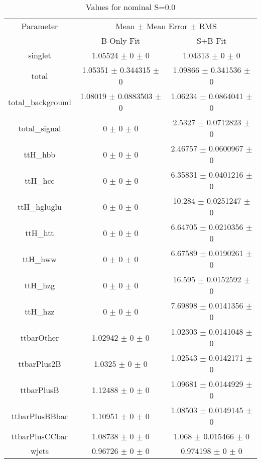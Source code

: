 \begin{table}
\centering
\caption{Values for nominal S=0.0}
\begin{tabular}{ccc}
\toprule
Parameter & \multicolumn{2}{c}{Mean $\pm$ Mean Error $\pm$ RMS}\\
 & B-Only Fit & S+B Fit\\
\midrule
singlet & \num{1.05524} $\pm$ \num{0} $\pm$ \num{0} & \num{1.04313} $\pm$ \num{0} $\pm$ \num{0}\\
total & \num{1.05351} $\pm$ \num{0.344315} $\pm$ \num{0} & \num{1.09866} $\pm$ \num{0.341536} $\pm$ \num{0}\\
total\_background & \num{1.08019} $\pm$ \num{0.0883503} $\pm$ \num{0} & \num{1.06234} $\pm$ \num{0.0864041} $\pm$ \num{0}\\
total\_signal & \num{0} $\pm$ \num{0} $\pm$ \num{0} & \num{2.5327} $\pm$ \num{0.0712823} $\pm$ \num{0}\\
ttH\_hbb & \num{0} $\pm$ \num{0} $\pm$ \num{0} & \num{2.46757} $\pm$ \num{0.0600967} $\pm$ \num{0}\\
ttH\_hcc & \num{0} $\pm$ \num{0} $\pm$ \num{0} & \num{6.35831} $\pm$ \num{0.0401216} $\pm$ \num{0}\\
ttH\_hgluglu & \num{0} $\pm$ \num{0} $\pm$ \num{0} & \num{10.284} $\pm$ \num{0.0251247} $\pm$ \num{0}\\
ttH\_htt & \num{0} $\pm$ \num{0} $\pm$ \num{0} & \num{6.64705} $\pm$ \num{0.0210356} $\pm$ \num{0}\\
ttH\_hww & \num{0} $\pm$ \num{0} $\pm$ \num{0} & \num{6.67589} $\pm$ \num{0.0190261} $\pm$ \num{0}\\
ttH\_hzg & \num{0} $\pm$ \num{0} $\pm$ \num{0} & \num{16.595} $\pm$ \num{0.0152592} $\pm$ \num{0}\\
ttH\_hzz & \num{0} $\pm$ \num{0} $\pm$ \num{0} & \num{7.69898} $\pm$ \num{0.0141356} $\pm$ \num{0}\\
ttbarOther & \num{1.02942} $\pm$ \num{0} $\pm$ \num{0} & \num{1.02303} $\pm$ \num{0.0141048} $\pm$ \num{0}\\
ttbarPlus2B & \num{1.0325} $\pm$ \num{0} $\pm$ \num{0} & \num{1.02543} $\pm$ \num{0.0142171} $\pm$ \num{0}\\
ttbarPlusB & \num{1.12488} $\pm$ \num{0} $\pm$ \num{0} & \num{1.09681} $\pm$ \num{0.0144929} $\pm$ \num{0}\\
ttbarPlusBBbar & \num{1.10951} $\pm$ \num{0} $\pm$ \num{0} & \num{1.08503} $\pm$ \num{0.0149145} $\pm$ \num{0}\\
ttbarPlusCCbar & \num{1.08738} $\pm$ \num{0} $\pm$ \num{0} & \num{1.068} $\pm$ \num{0.015466} $\pm$ \num{0}\\
wjets & \num{0.96726} $\pm$ \num{0} $\pm$ \num{0} & \num{0.974198} $\pm$ \num{0} $\pm$ \num{0}\\
\bottomrule
\end{tabular}
\end{table}